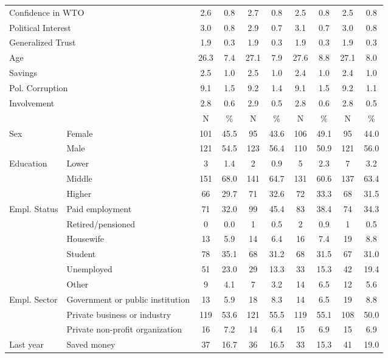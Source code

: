 \begin{table}[!htbp]
{\begin{tabular}[t]{llcccccccc}
\multicolumn{2}{l}{Confidence in WTO }  & 2.6 & 0.8 & 2.7 & 0.8 & 2.5 & 0.8 & 2.5 & 0.8\\
\multicolumn{2}{l}{Political Interest }  & 3.0 & 0.8 & 2.9 & 0.7 & 3.1 & 0.7 & 3.0 & 0.8\\
\multicolumn{2}{l}{Generalized Trust }  & 1.9 & 0.3 & 1.9 & 0.3 & 1.9 & 0.3 & 1.9 & 0.3\\
\multicolumn{2}{l}{Age }  & 26.3 & 7.4 & 27.1 & 7.9 & 27.6 & 8.8 & 27.1 & 8.0\\
\multicolumn{2}{l}{Savings }  & 2.5 & 1.0 & 2.5 & 1.0 & 2.4 & 1.0 & 2.4 & 1.0\\
\multicolumn{2}{l}{Pol. Corruption }  & 9.1 & 1.5 & 9.2 & 1.4 & 9.1 & 1.5 & 9.2 & 1.1\\
\multicolumn{2}{l}{Involvement }  & 2.8 & 0.6 & 2.9 & 0.5 & 2.8 & 0.6 & 2.8 & 0.5\\
\midrule
 &  & N & \% & N & \% & N & \% & N & \%\\
\midrule
Sex & Female & 101 & 45.5 & 95 & 43.6 & 106 & 49.1 & 95 & 44.0\\
 & Male & 121 & 54.5 & 123 & 56.4 & 110 & 50.9 & 121 & 56.0\\
Education & Lower & 3 & 1.4 & 2 & 0.9 & 5 & 2.3 & 7 & 3.2\\
 & Middle & 151 & 68.0 & 141 & 64.7 & 131 & 60.6 & 137 & 63.4\\
 & Higher & 66 & 29.7 & 71 & 32.6 & 72 & 33.3 & 68 & 31.5\\
Empl. Status & Paid employment & 71 & 32.0 & 99 & 45.4 & 83 & 38.4 & 74 & 34.3\\
 & Retired/pensioned & 0 & 0.0 & 1 & 0.5 & 2 & 0.9 & 1 & 0.5\\
 & Housewife & 13 & 5.9 & 14 & 6.4 & 16 & 7.4 & 19 & 8.8\\
 & Student & 78 & 35.1 & 68 & 31.2 & 68 & 31.5 & 67 & 31.0\\
 & Unemployed & 51 & 23.0 & 29 & 13.3 & 33 & 15.3 & 42 & 19.4\\
 & Other & 9 & 4.1 & 7 & 3.2 & 14 & 6.5 & 12 & 5.6\\
Empl. Sector & Government or public institution & 13 & 5.9 & 18 & 8.3 & 14 & 6.5 & 19 & 8.8\\
 & Private business or industry & 119 & 53.6 & 121 & 55.5 & 119 & 55.1 & 108 & 50.0\\
 & Private non-profit organization & 16 & 7.2 & 14 & 6.4 & 15 & 6.9 & 15 & 6.9\\
Last year & Saved money & 37 & 16.7 & 36 & 16.5 & 33 & 15.3 & 41 & 19.0\\

\end{tabular}}
\end{table}
